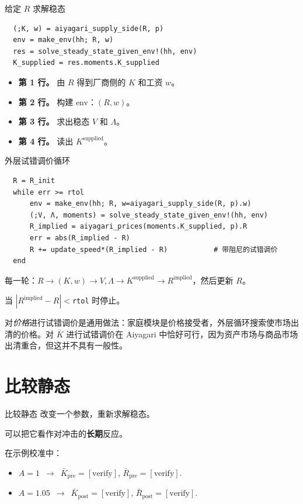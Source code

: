 \documentclass[10pt,aspectratio=169]{beamer}
\begin{document}
\begin{frame}[fragile]{给定 $R$ 求解稳态}
  \begin{lstlisting}
  (;K, w) = aiyagari_supply_side(R, p)
  env = make_env(hh; R, w)
  res = solve_steady_state_given_env!(hh, env)
  K_supplied = res.moments.K_supplied
  \end{lstlisting}
  \begin{itemize}
    \item \textbf{第 1 行。} 由 $R$ 得到厂商侧的 $K$ 和工资 $w$。
    \item \textbf{第 2 行。} 构建 env：$(R, w)$。
    \item \textbf{第 3 行。} 求出稳态 $V$ 和 $\Lambda$。
    \item \textbf{第 4 行。} 读出 $K^{\mathrm{supplied}}$。
  \end{itemize}
\end{frame}

\begin{frame}[fragile]{外层试错调价循环}
  \begin{lstlisting}
  R = R_init
  while err >= rtol
      env = make_env(hh; R, w=aiyagari_supply_side(R, p).w)
      (;V, Λ, moments) = solve_steady_state_given_env!(hh, env)
      R_implied = aiyagari_prices(moments.K_supplied, p).R
      err = abs(R_implied - R)
      R += update_speed*(R_implied - R)           # 带阻尼的试错调价
  end
  \end{lstlisting}
  每一轮：$R \to (K, w) \to V,\Lambda \to K^{\mathrm{supplied}} \to R^{\mathrm{implied}}$，然后更新 $R$。

  当 $|R^{\mathrm{implied}} - R| < $\texttt{rtol} 时停止。

  \vspace{0.4em}
  \footnotesize 对\emph{价格}进行试错调价是通用做法：家庭模块是价格接受者，外层循环搜索使市场出清的价格。对 $\bar K$ 进行试错调价在 Aiyagari 中恰好可行，因为资产市场与商品市场出清重合，但这并不具有一般性。
\end{frame}

\section[比较静态]{比较静态}

\begin{frame}{比较静态}
  改变一个参数，重新求解稳态。

  可以把它看作对冲击的\textbf{长期}反应。

  在示例校准中：
  \begin{itemize}
    \item $A = 1$ \,$\to$\, $\bar K_{\mathrm{pre}} = [\text{verify}]$, $\bar R_{\mathrm{pre}} = [\text{verify}]$.
    \item $A = 1.05$ \,$\to$\, $\bar K_{\mathrm{post}} = [\text{verify}]$, $\bar R_{\mathrm{post}} = [\text{verify}]$.
  \end{itemize}
\end{frame}
\end{document}
